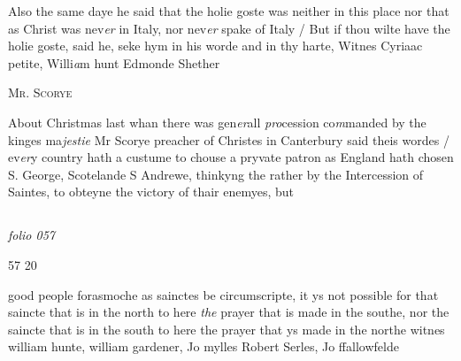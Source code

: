 \documentclass[12pt, a4paper]{book}
\begin{document}
		\ifthenelse{\isodd{\thepage}}
		{\reversemarginpar}
		{\normalmarginpar}
		Also the same daye he said that the holie goste was
 neither in this place nor that as Christ was nev\textit{er} in
 Italy, nor nev\textit{er} spake of Italy / But if thou wilte
 have the holie goste, said he, seke hym in his worde
 and in thy harte, Witnes Cyriaac petite, Willi\textit{a}m
 hunt Edmonde Shether
               	
 

               
                  
				\begin{center}  {\scshape Mr. Scorye}  \end{center}
			
               	
               		
				\marginpar[\vspace{0.5cm}{\textcolor{Gray}{seditious}}]{}
			
               		
		\ifthenelse{\isodd{\thepage}}
		{\reversemarginpar}
		{\normalmarginpar}
		About Christmas last whan there was gen\textit{er}all
 \textit{pro}cession co\textit{m}manded by the kinges ma\textit{jestie} Mr Scorye
               			preacher of Christes in Canterbury said theis wordes /
 ev\textit{er}y country hath a custume to chouse a pryvate patron
               	as England hath chosen S. George, Scotelande S
 Andrewe, thinkyng the rather by the Intercession of
 Saintes, to obteyne the victory of thair enemyes, but



\dotfill
					  \subsection*{}

\textit{folio 057}


\begin{flushright}{\color{Mahogany}57} 20\end{flushright}
	
				\marginpar[\vspace{0.5cm}{\textcolor{Gray}{+}}]{}
			
		
		\ifthenelse{\isodd{\thepage}}
		{\reversemarginpar}
		{\normalmarginpar}
		good people forasmoche as sainctes be circumscripte, it ys
 not possible for that saincte that is in the north to here \textit{the}
 prayer that is made in the southe, nor the saincte that is
 in the south to here the prayer that ys made in the northe
 witnes william hunte, william gardener, Jo mylles
  Robert Serles, Jo ffallowfelde
\end{document}
